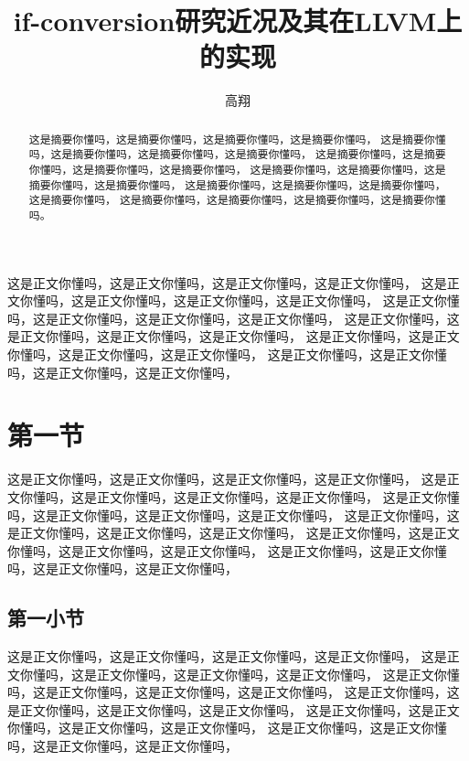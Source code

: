 \documentclass[11pt,a4paper]{article}
\title{if-conversion研究近况及其在LLVM上的实现}
\author{高翔}
\begin{document}
\maketitle

\begin{abstract}
这是摘要你懂吗，这是摘要你懂吗，这是摘要你懂吗，这是摘要你懂吗，
这是摘要你懂吗，这是摘要你懂吗，这是摘要你懂吗，这是摘要你懂吗，
这是摘要你懂吗，这是摘要你懂吗，这是摘要你懂吗，这是摘要你懂吗，
这是摘要你懂吗，这是摘要你懂吗，这是摘要你懂吗，这是摘要你懂吗，
这是摘要你懂吗，这是摘要你懂吗，这是摘要你懂吗，这是摘要你懂吗，
这是摘要你懂吗，这是摘要你懂吗，这是摘要你懂吗，这是摘要你懂吗。
\end{abstract}

\newpage

\tableofcontents

\newpage

这是正文你懂吗，这是正文你懂吗，这是正文你懂吗，这是正文你懂吗，
这是正文你懂吗，这是正文你懂吗，这是正文你懂吗，这是正文你懂吗，
这是正文你懂吗，这是正文你懂吗，这是正文你懂吗，这是正文你懂吗，
这是正文你懂吗，这是正文你懂吗，这是正文你懂吗，这是正文你懂吗，
这是正文你懂吗，这是正文你懂吗，这是正文你懂吗，这是正文你懂吗，
这是正文你懂吗，这是正文你懂吗，这是正文你懂吗，这是正文你懂吗，

\section{第一节}

这是正文你懂吗，这是正文你懂吗，这是正文你懂吗，这是正文你懂吗，
这是正文你懂吗，这是正文你懂吗，这是正文你懂吗，这是正文你懂吗，
这是正文你懂吗，这是正文你懂吗，这是正文你懂吗，这是正文你懂吗，
这是正文你懂吗，这是正文你懂吗，这是正文你懂吗，这是正文你懂吗，
这是正文你懂吗，这是正文你懂吗，这是正文你懂吗，这是正文你懂吗，
这是正文你懂吗，这是正文你懂吗，这是正文你懂吗，这是正文你懂吗，

\subsection{第一小节}

这是正文你懂吗，这是正文你懂吗，这是正文你懂吗，这是正文你懂吗，
这是正文你懂吗，这是正文你懂吗，这是正文你懂吗，这是正文你懂吗，
这是正文你懂吗，这是正文你懂吗，这是正文你懂吗，这是正文你懂吗，
这是正文你懂吗，这是正文你懂吗，这是正文你懂吗，这是正文你懂吗，
这是正文你懂吗，这是正文你懂吗，这是正文你懂吗，这是正文你懂吗，
这是正文你懂吗，这是正文你懂吗，这是正文你懂吗，这是正文你懂吗，
\end{document}
